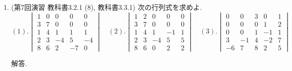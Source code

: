 \documentclass[dvipdfmx,a4paper,11pt]{article} %
\newcommand{\sgn}{{\rm sgn}}
\theoremstyle{definition}
\begin{document}
\begin{enumerate}[label=\textbf{問題}\arabic*.]
解答(2).
$\sigma$ の下段は $(4,1,5,3,2)$ である。その転倒は
\[
(1,2),\ (1,4),\ (1,5),\ (3,4),\ (3,5),\ (4,5)
\]
の $6$ 個である。したがって、$\sigma$ の転倒数は $6$ であり、
\(
\sgn(\sigma)=(-1)^6=1
\)
である。

一方、$\tau$ の下段は $(2,1,4,5,3)$ である。その転倒は
\[
(1,2),\ (3,5),\ (4,5)
\]
の $3$ 個である。したがって、$\tau$ の転倒数は $3$ であり、
\(
\sgn(\tau)=(-1)^3=-1
\)
である。

$\sigma\tau$ の下段は $(1,4,3,2,5)$ である。その転倒は
\[
(2,3),\ (2,4),\ (3,4)
\]
の $3$ 個である。したがって、$\sigma\tau$ の転倒数は $3$ であり、
\(
\sgn(\sigma\tau)=(-1)^3=-1.
\)

解答(3).
また、前問より
\[
\sgn(\sigma)\sgn(\tau)=1\cdot(-1)=-1
\]
であるから、
\(
\sgn(\sigma\tau)=\sgn(\sigma)\sgn(\tau)
\)
が確認できる。



 \item (第7回演習 教科書3.2.1 (8), 教科書3.3.1) 
 次の行列式を求めよ.
\[
(1).
\begin{vmatrix}
1&0&0&0&0\\
3&7&0&0&0\\
1&4&1&1&1\\
2&3&-4&5&-4\\
8&6&2&-7&0
\end{vmatrix}
\quad
(2).
\begin{vmatrix}
1&2&0&0&0\\
3&7&0&0&0\\
1&4&1&-1&1\\
2&3&-4&5&5\\
8&6&0&2&2
\end{vmatrix}
\quad
(3).
\begin{vmatrix}
0&0&3&0&1\\
0&0&0&1&2\\
0&0&1&-1&1\\
3&-1&4&-2&7\\
-6&7&8&2&5
\end{vmatrix}
\]

解答. 


\end{enumerate}
\end{document}

